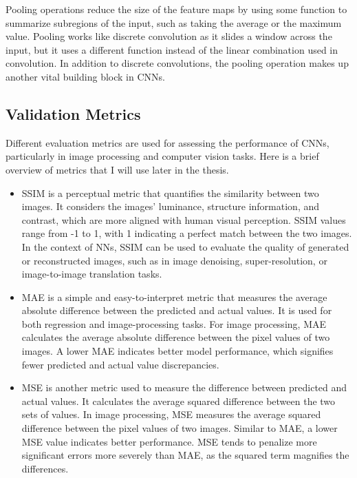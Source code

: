 Pooling operations reduce the size of the feature maps by using some function to summarize subregions of the input, such as taking the average or the maximum value. Pooling works like discrete convolution as it slides a window across the input, but it uses a different function instead of the linear combination used in convolution. In addition to discrete convolutions, the pooling operation makes up another vital building block in \glspl{CNN}.

\subsection{Validation Metrics}
\label{subsec:val_metrics}

Different evaluation metrics are used for assessing the performance of \glspl{CNN}, particularly in image processing and computer vision tasks. Here is a brief overview of metrics that I will use later in the thesis.
\begin{itemize}
    \item \gls{SSIM} is a perceptual metric that quantifies the similarity between two images. It considers the images' luminance, structure information, and contrast, which are more aligned with human visual perception. \gls{SSIM} values range from -1 to 1, with 1 indicating a perfect match between the two images. In the context of \glspl{NN}, \gls{SSIM} can be used to evaluate the quality of generated or reconstructed images, such as in image denoising, super-resolution, or image-to-image translation tasks.
    \item \gls{MAE} is a simple and easy-to-interpret metric that measures the average absolute difference between the predicted and actual values. It is used for both regression and image-processing tasks. For image processing, \gls{MAE} calculates the average absolute difference between the pixel values of two images. A lower \gls{MAE} indicates better model performance, which signifies fewer predicted and actual value discrepancies.
    \item \gls{MSE} is another metric used to measure the difference between predicted and actual values. It calculates the average squared difference between the two sets of values. In image processing, \gls{MSE} measures the average squared difference between the pixel values of two images. Similar to \gls{MAE}, a lower \gls{MSE} value indicates better performance. \gls{MSE} tends to penalize more significant errors more severely than MAE, as the squared term magnifies the differences.
\end{itemize}

